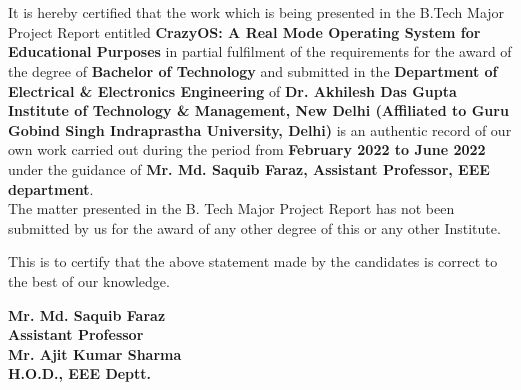 \chapter*{}
It is hereby certified that the work which is being presented in the B.Tech Major Project Report entitled \textbf{CrazyOS: A Real Mode Operating System for Educational Purposes} in partial fulfilment of the requirements for the award of the degree of \textbf{Bachelor of Technology} and submitted in the \textbf{Department of Electrical \& Electronics Engineering} of \textbf{Dr. Akhilesh Das Gupta Institute of Technology \& Management, New Delhi (Affiliated to Guru Gobind Singh Indraprastha University, Delhi)} is an authentic record of our own work carried out during the period from \textbf{February 2022 to June 2022} under the guidance of \textbf{Mr. Md. Saquib Faraz, Assistant Professor, EEE department}.\\[1.0\baselineskip]
The matter presented in the B. Tech Major Project Report has not been submitted by us for the award of any other degree of this or any other Institute.\\[\baselineskip]
\begin{multicols}{4}
{\normalsize
{}
}
\end{multicols}
This is to certify that the above statement made by the candidates is correct to the best of our knowledge.\\[\baselineskip]
\begin{multicols}{2}
\centering
{\hspace{-2.5cm}
\textbf{Mr. Md. Saquib Faraz}\\
\hspace{-2.5cm}
\textbf{Assistant Professor}\\
\columnbreak
\centering\textbf{\hspace{2.5cm}Mr. Ajit Kumar Sharma\\\hspace{2.5cm}H.O.D., EEE Deptt.}\\
}
\end{multicols}
